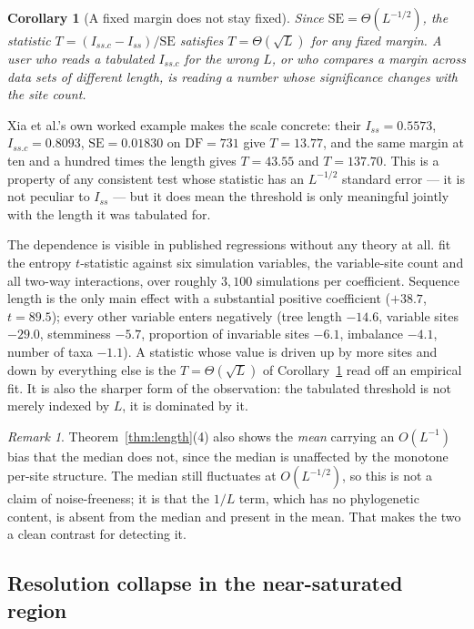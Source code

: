 \documentclass[preprint,12pt,authoryear]{elsarticle}
\newcommand{\Iss}{I_{ss}}
\newcommand{\Issc}{I_{ss.c}}
\newtheorem{corollary}[theorem]{Corollary}
\theoremstyle{definition}
\theoremstyle{remark}
\newtheorem{remark}[theorem]{Remark}
\begin{document}
\begin{corollary}[A fixed margin does not stay fixed]
\label{cor:length}
Since $\mathrm{SE}=\Theta(L^{-1/2})$, the statistic
$T=(\Issc-\Iss)/\mathrm{SE}$ satisfies $T=\Theta(\sqrt L)$ for any
\emph{fixed} margin. A user who reads a tabulated $\Issc$ for the wrong $L$,
or who compares a margin across data sets of different length, is reading a
number whose significance changes with the site count.
\end{corollary}

Xia et al.'s own worked example makes the scale concrete: their
$\Iss=0.5573$, $\Issc=0.8093$, $\mathrm{SE}=0.01830$ on $\mathrm{DF}=731$ give
$T=13.77$, and the same margin at ten and a hundred times the length gives
$T=43.55$ and $T=137.70$. This is a property of any consistent test whose
statistic has an $L^{-1/2}$ standard error --- it is not peculiar to $\Iss$ ---
but it does mean the threshold is only meaningful jointly with the length it
was tabulated for.

The dependence is visible in published regressions without any theory at all.
\citet{duchene2022saturation} fit the entropy $t$-statistic against six
simulation variables, the variable-site count and all two-way interactions,
over roughly $3{,}100$ simulations per coefficient. Sequence length is the
only main effect with a substantial positive coefficient ($+38.7$,
$t=89.5$); every other variable enters negatively (tree length $-14.6$,
variable sites $-29.0$, stemminess $-5.7$, proportion of invariable sites
$-6.1$, imbalance $-4.1$, number of taxa $-1.1$). A statistic whose value is
driven up by more sites and down by everything else is the $T=\Theta(\sqrt L)$
of Corollary~\ref{cor:length} read off an empirical fit. It is also the
sharper form of the observation: the tabulated threshold is not merely
indexed by $L$, it is dominated by it.

\begin{remark}
Theorem~\ref{thm:length}(4) also shows the \emph{mean} carrying an $O(L^{-1})$
bias that the median does not, since the median is unaffected by the monotone
per-site structure. The median still fluctuates at $O(L^{-1/2})$, so this is
not a claim of noise-freeness; it is that the $1/L$ term, which has no
phylogenetic content, is absent from the median and present in the mean. That
makes the two a clean contrast for detecting it.
\end{remark}

\subsection{Resolution collapse in the near-saturated region}
\label{sec:collapse}
\end{document}
